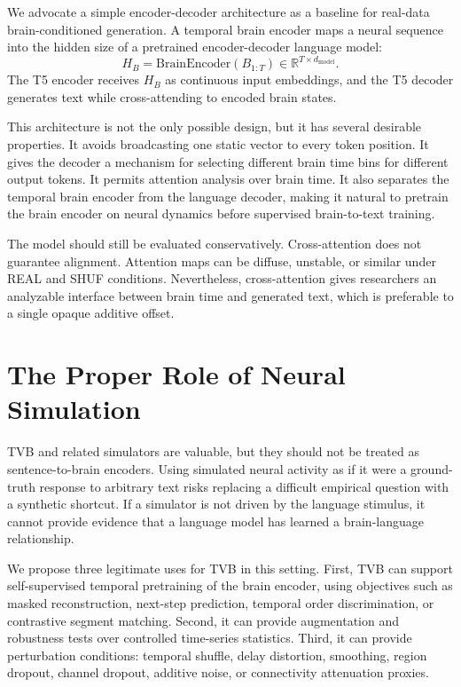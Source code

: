 \documentclass{article}
\begin{document}
We advocate a simple encoder-decoder architecture as a baseline for real-data brain-conditioned generation.
A temporal brain encoder maps a neural sequence into the hidden size of a pretrained encoder-decoder language model:
\[
H_B = \mathrm{BrainEncoder}(B_{1:T}) \in \mathbb{R}^{T \times d_{\mathrm{model}}}.
\]
The T5 encoder receives $H_B$ as continuous input embeddings, and the T5 decoder generates text while cross-attending to encoded brain states.

This architecture is not the only possible design, but it has several desirable properties.
It avoids broadcasting one static vector to every token position.
It gives the decoder a mechanism for selecting different brain time bins for different output tokens.
It permits attention analysis over brain time.
It also separates the temporal brain encoder from the language decoder, making it natural to pretrain the brain encoder on neural dynamics before supervised brain-to-text training.

The model should still be evaluated conservatively.
Cross-attention does not guarantee alignment.
Attention maps can be diffuse, unstable, or similar under REAL and SHUF conditions.
Nevertheless, cross-attention gives researchers an analyzable interface between brain time and generated text, which is preferable to a single opaque additive offset.

\section{The Proper Role of Neural Simulation}

TVB and related simulators are valuable, but they should not be treated as sentence-to-brain encoders.
Using simulated neural activity as if it were a ground-truth response to arbitrary text risks replacing a difficult empirical question with a synthetic shortcut.
If a simulator is not driven by the language stimulus, it cannot provide evidence that a language model has learned a brain-language relationship.

We propose three legitimate uses for TVB in this setting.
First, TVB can support self-supervised temporal pretraining of the brain encoder, using objectives such as masked reconstruction, next-step prediction, temporal order discrimination, or contrastive segment matching.
Second, it can provide augmentation and robustness tests over controlled time-series statistics.
Third, it can provide perturbation conditions: temporal shuffle, delay distortion, smoothing, region dropout, channel dropout, additive noise, or connectivity attenuation proxies.
\end{document}
